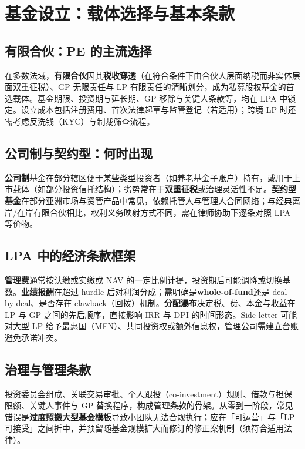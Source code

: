 \chapter{基金设立：载体选择与基本条款}

\section{有限合伙：PE 的主流选择}

在多数法域，\textbf{有限合伙}因其\textbf{税收穿透}（在符合条件下由合伙人层面纳税而非实体层面双重征税）、GP 无限责任与 LP 有限责任的清晰划分，成为私募股权基金的首选载体。基金期限、投资期与延长期、GP 移除与关键人条款等，均在 LPA 中锁定。设立成本包括注册费用、首次法律起草与监管登记（若适用）；跨境 LP 时还需考虑反洗钱（KYC）与制裁筛查流程。

\section{公司制与契约型：何时出现}

\textbf{公司制}基金在部分辖区便于某些类型投资者（如养老基金子账户）持有，或用于上市载体（如部分投资信托结构）；劣势常在于\textbf{双重征税}或治理灵活性不足。\textbf{契约型基金}在部分亚洲市场与资管产品中常见，依赖托管人与管理人合同网络；与经典离岸/在岸有限合伙相比，权利义务映射方式不同，需在律师协助下逐条对照 LPA 等价物。

\section{LPA 中的经济条款框架}

\textbf{管理费}通常按认缴或实缴或 NAV 的一定比例计提，投资期后可能调降或切换基数。\textbf{业绩报酬}在超过 hurdle 后对利润分成；需明确是\textbf{whole-of-fund}还是 deal-by-deal、是否存在 clawback（回拨）机制。\textbf{分配瀑布}决定税、费、本金与收益在 LP 与 GP 之间的先后顺序，直接影响 IRR 与 DPI 的时间形态。Side letter 可能对大型 LP 给予最惠国（MFN）、共同投资权或额外信息权，管理公司需建立台账避免承诺冲突。

\section{治理与管理条款}

投资委员会组成、关联交易审批、个人跟投（co-investment）规则、借款与担保限额、关键人事件与 GP 替换程序，构成管理条款的骨架。从零到一阶段，常见错误是\textbf{过度照搬大型基金模板}导致小团队无法合规执行；应在「可运营」与「LP 可接受」之间折中，并预留随基金规模扩大而修订的修正案机制（须符合适用法律）。
